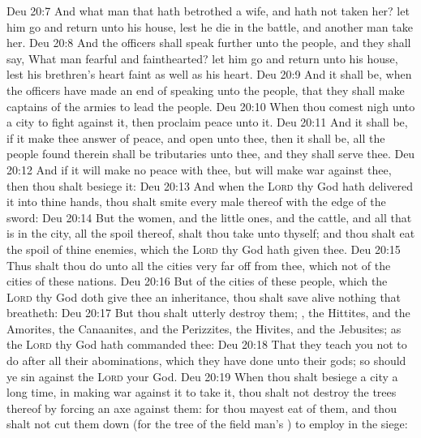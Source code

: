 \vs Deu 20:7 And what man  that hath betrothed a wife, and hath not taken her? let him go and return unto his house, lest he die in the battle, and another man take her.
\vs Deu 20:8 And the officers shall speak further unto the people, and they shall say, What man  fearful and fainthearted? let him go and return unto his house, lest his brethren's heart faint as well as his heart.
\vs Deu 20:9 And it shall be, when the officers have made an end of speaking unto the people, that they shall make captains of the armies to lead the people.
\vs Deu 20:10 When thou comest nigh unto a city to fight against it, then proclaim peace unto it.
\vs Deu 20:11 And it shall be, if it make thee answer of peace, and open unto thee, then it shall be,  all the people  found therein shall be tributaries unto thee, and they shall serve thee.
\vs Deu 20:12 And if it will make no peace with thee, but will make war against thee, then thou shalt besiege it:
\vs Deu 20:13 And when the \textsc{Lord} thy God hath delivered it into thine hands, thou shalt smite every male thereof with the edge of the sword:
\vs Deu 20:14 But the women, and the little ones, and the cattle, and all that is in the city,  all the spoil thereof, shalt thou take unto thyself; and thou shalt eat the spoil of thine enemies, which the \textsc{Lord} thy God hath given thee.
\vs Deu 20:15 Thus shalt thou do unto all the cities  very far off from thee, which  not of the cities of these nations.
\vs Deu 20:16 But of the cities of these people, which the \textsc{Lord} thy God doth give thee  an inheritance, thou shalt save alive nothing that breatheth:
\vs Deu 20:17 But thou shalt utterly destroy them; , the Hittites, and the Amorites, the Canaanites, and the Perizzites, the Hivites, and the Jebusites; as the \textsc{Lord} thy God hath commanded thee:
\vs Deu 20:18 That they teach you not to do after all their abominations, which they have done unto their gods; so should ye sin against the \textsc{Lord} your God.
\vs Deu 20:19 When thou shalt besiege a city a long time, in making war against it to take it, thou shalt not destroy the trees thereof by forcing an axe against them: for thou mayest eat of them, and thou shalt not cut them down (for the tree of the field  man's ) to employ  in the siege:
